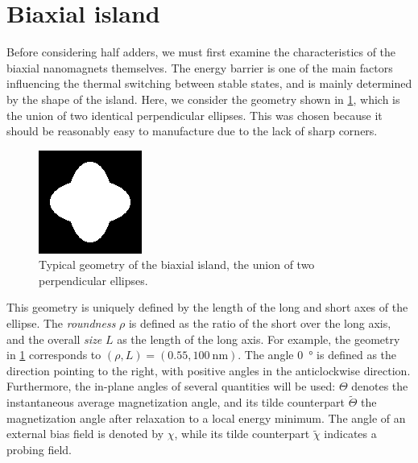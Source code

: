 \documentclass[twocolumn]{phdsymp}
\begin{document}
\section{Biaxial island}
Before considering half adders, we must first examine the characteristics of the biaxial nanomagnets themselves. The energy barrier is one of the main factors influencing the thermal switching between stable states, and is mainly determined by the shape of the island. Here, we consider the geometry shown in \cref{fig:EA_geom}, which is the union of two identical perpendicular ellipses. This was chosen because it should be reasonably easy to manufacture due to the lack of sharp corners. \par
\begin{figure}
    \centering
    \includegraphics[width=0.4\columnwidth]{Figures/geomPlus55.png}
    \caption{Typical geometry of the biaxial island, the union of two perpendicular ellipses.}
    \label{fig:EA_geom}
\end{figure}
This geometry is uniquely defined by the length of the long and short axes of the ellipse. The \textit{roundness} $\rho$ is defined as the ratio of the short over the long axis, and the overall \textit{size} $L$ as the length of the long axis. For example, the geometry in \cref{fig:EA_geom} corresponds to $(\rho,L) = (0.55, \SI{100}{\nano\metre})$. The angle \SI{0}{\degree} is defined as the direction pointing to the right, with positive angles in the anticlockwise direction. Furthermore, the in-plane angles of several quantities will be used: $\Theta$ denotes the instantaneous average magnetization angle, and its tilde counterpart $\widetilde{\Theta}$ the magnetization angle after relaxation to a local energy minimum. The angle of an external bias field is denoted by $\chi$, while its tilde counterpart $\widetilde{\chi}$ indicates a probing field. \par
\end{document}
